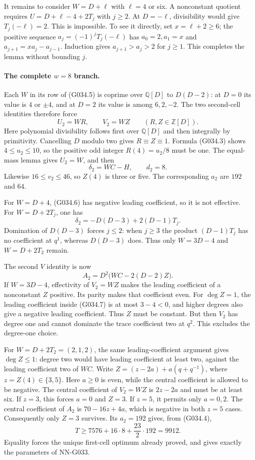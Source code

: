 It remains to consider $W=D+\ell$ with $\ell=4$ or six.
A nonconstant quotient requires
$U=D+\ell-4+2T_j$ with $j\ge2$.
At $D=-\ell$, divisibility would give $T_j(-\ell)=2$.
This is impossible. To see it directly, set $x=\ell+2\ge6$;
the positive sequence
$a_j=(-1)^jT_j(-\ell)$ has $a_0=2,a_1=x$ and
$a_{j+1}=xa_j-a_{j-1}$. Induction gives
$a_{j+1}>a_j>2$ for $j\ge1$.
This completes the lemma without bounding $j$.

\paragraph{The complete $w=8$ branch.}
Each $W$ in its row of (G034.5) is coprime over
$\mathbb Q[D]$ to $D(D-2)$: at $D=0$ its value is
$4$ or $\pm4$, and at $D=2$ its value is among
$6,2,-2$. The two second-cell identities therefore
force
\[
 U_2=WR,\qquad V_2=WZ\qquad(R,Z\in\mathbb Z[D]).
\]
Here polynomial divisibility follows first over
$\mathbb Q[D]$ and then integrally by primitivity.
Cancelling $D$ modulo two gives $R\equiv Z\equiv1$.
Formula (G034.3) shows $4\le u_2\le10$, so the
positive odd integer $R(4)=u_2/8$ must be one.
The equal-mass lemma gives $U_2=W$, and then
\[
                 \delta_2=WC-H,\qquad d_2=8.         \tag{G034.6}
\]
Likewise $16\le v_2\le46$, so $Z(4)$ is three or five.
The corresponding $a_2$ are $192$ and $64$.

For $W=D+4$, (G034.6) has negative leading coefficient,
so it is not effective. For $W=D+2T_j$, one has
\[
             \delta_2=-D(D-3)+2(D-1)T_j.
\]
Domination of $D(D-3)$ forces $j\le2$: when $j\ge3$
the product $(D-1)T_j$ has no coefficient at $q^1$,
whereas $D(D-3)$ does. Thus only $W=3D-4$ and
$W=D+2T_2$ remain.

The second $V$ identity is now
\[
              A_2=D^2\bigl(WC-2(D-2)Z\bigr).         \tag{G034.7}
\]
If $W=3D-4$, effectivity of $V_2=WZ$ makes the leading
coefficient of a nonconstant $Z$ positive. Its parity
makes that coefficient even. For $\deg Z=1$,
the leading coefficient inside (G034.7) is at most
$3-4<0$, and higher degrees also give a negative
leading coefficient. Thus $Z$ must be constant.
But then $V_2$ has degree one and cannot dominate
the trace coefficient two at $q^2$. This excludes
the degree-one choice.

For $W=D+2T_2=(2,1,2)$, the same leading-coefficient
argument gives $\deg Z\le1$: degree two would have
leading coefficient at least two, against the leading
coefficient two of $WC$.
Write $Z=(z-2a)+a(q+q^{-1})$, where $z=Z(4)\in\{3,5\}$.
Here $a\ge0$ is even, while the central coefficient
is allowed to be negative. The central coefficient
of $V_2=WZ$ is $2z-2a$ and must be at least six.
If $z=3$, this forces $a=0$ and $Z=3$.
If $z=5$, it permits only $a=0,2$.
The central coefficient of $A_2$ is
$70-16z+4a$, which is negative in both $z=5$ cases.
Consequently only $Z=3$ survives. Its $a_2=192$
gives, from (G034.4),
\[
                  T\ge7576+16\cdot8+\frac{23}{2}\cdot192
                    =9912.                         \tag{G034.8}
\]
Equality forces the unique first-cell optimum already
proved, and gives exactly the parameters of NN-G033.

